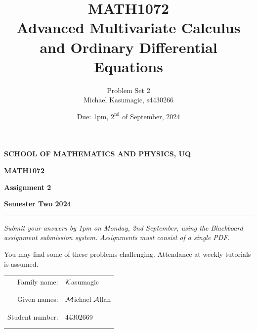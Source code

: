 \documentclass[a4paper, 11pt]{report}
\title{\Huge{MATH1072}\\Advanced Multivariate Calculus and Ordinary Differential Equations}
\author{\huge{Problem Set 2}\\\huge{Michael Kasumagic, s4430266}}
\date{\huge{Due: 1pm, $2^\text{nd}$ of September, 2024}}
\begin{document}
\begin{center}
{\bf SCHOOL OF MATHEMATICS AND PHYSICS, UQ}
\end{center}
\centerline{\large\bf MATH1072}
\vspace{.1cm}   
\centerline{\large\bf Assignment 2}
\vspace{.1cm}
\centerline{\large\bf Semester Two 2024}

\vspace{3mm}
\hrule
\vspace{3mm}

{\it Submit your answers by 1pm on Monday, 2nd September, using the
Blackboard assignment submission system. Assignments must consist of a single PDF.
}

You may find some of these problems challenging. Attendance at weekly tutorials is assumed.

\vspace{1cm}

\begin{tabular}{rl}
	Family name: & $\mathcal{K}$asumagic \\
	& \\
	& \\
	Given names: & $\mathcal{M}$ichael $\mathcal{A}$llan \\
	& \\
	& \\
	Student number: & 44302669 \\
	& \\
	& \\
\end{tabular}
\end{document}
